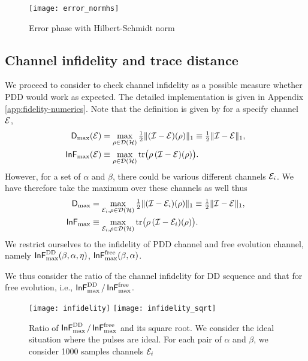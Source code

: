 \documentclass[aps,pra,reprint,superscriptaddress]{revtex4-2}
\begin{document}
\begin{figure}
    \centering
    \texttt{[image: error\_normhs]}
    \caption{Error phase with Hilbert-Schmidt norm} 
    \label{fig:pdd-region-check-norm}
\end{figure}

\subsection{Channel infidelity and trace distance}
We proceed to consider to check channel infidelity as a possible measure whether PDD would work as expected. The detailed implementation is given in Appendix \ref{app:fidelity-numerics}. Note that the definition is given by for a specify channel $\mathcal{E}$,
\begin{align}
\operatorname{\mathsf{D}}_{\max}(\mathcal{E}) &= \max_{\rho\in\mathcal{D}(\mathcal{H})} \tfrac{1}{2} \Vert { (\mathcal{I}-\mathcal{E}) (\rho)} \Vert_1 \equiv \tfrac{1}{2} \Vert { \mathcal{I}-\mathcal{E}} \Vert_1, \\
\operatorname{\mathsf{InF}}_{\max}(\mathcal{E}) &\equiv \max_{\rho\in\mathcal{D}(\mathcal{H})} \operatorname{tr}\bigl(\rho\, (\mathcal{I} -\mathcal{E})(\rho)\bigr).
\end{align}
However, for a set of $\alpha$ and $\beta$, there could be various different channels ${\mathcal{E}}_i$. We have therefore take the maximum over these channels as well thus  
\begin{align}
    \operatorname{\mathsf{D}}_{\max} &= \max_{{\mathcal{E}}_i, \rho\in\mathcal{D}(\mathcal{H})} \tfrac{1}{2} \Vert { (\mathcal{I}- {\mathcal{E}}_{i}) (\rho)} \Vert_1 \equiv \tfrac{1}{2} \Vert { \mathcal{I}-\mathcal{E}} \Vert_1, \\
    \operatorname{\mathsf{InF}}_{\max} &\equiv \max_{ {\mathcal{E}}_i,\rho\in\mathcal{D}(\mathcal{H})} \operatorname{tr}\bigl(\rho\, (\mathcal{I} -{\mathcal{E}}_{i})(\rho)\bigr).
\end{align}
We restrict ourselves to the infidelity of PDD channel and free evolution channel, namely $\operatorname{\mathsf{InF}}^{\rm DD}_{\rm max}(\beta, \alpha, \eta)$,  $\operatorname{\mathsf{InF}}^{\rm free}_{\rm max}(\beta, \alpha)$. 


We thus consider the ratio of the channel infidelity for DD sequence and that for free evolution, i.e., $\operatorname{\mathsf{InF}}^{\rm DD}_{\rm max} / \operatorname{\mathsf{InF}}^{\rm free}_{\rm max}$. 

\begin{figure}
    \centering
    \texttt{[image: infidelity]}
    \texttt{[image: infidelity\_sqrt]}
    \caption{Ratio of $\operatorname{\mathsf{InF}}^{\rm DD}_{\rm max} / \operatorname{\mathsf{InF}}^{\rm free}_{\rm max}$ and its square root. We consider the ideal situation where the pulses are ideal. For each pair of $\alpha$ and $\beta$, we consider 1000 samples channels ${\mathcal{E}}_i$} 
    \label{fig:pdd-region-fidelity}
\end{figure}
\end{document}
